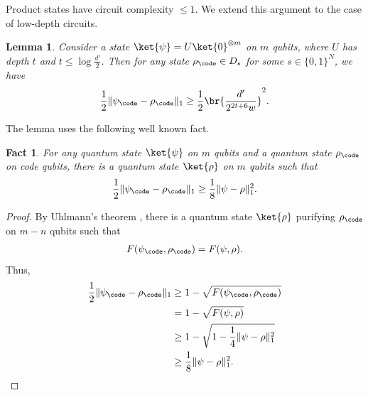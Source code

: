 \documentclass[11pt]{article}
\newtheorem{lemma}[theorem]{Lemma}
\newtheorem{fact}[theorem]{Fact}
\begin{document}
Product states have circuit complexity $\leq 1$. We extend this argument to the case of low-depth circuits.
%
\begin{lemma}
\label{lem:lowdepthunc}
Consider a state $\ket{\psi}= U\ket{0}^{\otimes m}$ on $m$ qubits, where $U$ has depth $t$ and $t\leq \log\frac{d'}{2}$. Then for any state $\rho_{\code}\in D_{s}$ for some $s\in \{0,1\}^N$, we have \begin{align}\frac{1}{2}\|\psi_{\code}-\rho_{\code}\|_1\geq \frac{1}{2}\br{\frac{d'}{2^{2t+6}w}}^2.
\end{align}
\end{lemma}
The lemma uses the following well known fact.
\begin{fact}
\label{fact:uhlmann}
For any quantum state $\ket{\psi}$ on $m$ qubits and a quantum state $\rho_{\code}$ on code qubits, there is a quantum state $\ket{\rho}$ on $m$ qubits such that
\begin{align}\frac{1}{2}\|\psi_{\code}-\rho_{\code}\|_1\geq \frac{1}{8}\|\psi-\rho\|^2_1.\end{align}
\end{fact}
\begin{proof}
By Uhlmann's theorem \cite{uhlmann76}, there is a quantum state $\ket{\rho}$ purifying $\rho_{\code}$ on $m-n$ qubits such that
\begin{align}F(\psi_{\code}, \rho_{\code})=F(\psi,\rho).\end{align}
Thus,
\begin{align}
\frac{1}{2}\|\psi_{\code}-\rho_{\code}\|_1 &\geq 1-\sqrt{F(\psi_{\code},\rho_{\code})} \\
&=1-\sqrt{F(\psi,\rho)} \\
&\geq 1-\sqrt{1-\frac{1}{4}\|\psi-\rho\|^2_1} \\
&\geq \frac{1}{8}\|\psi-\rho\|^2_1.
\end{align}
\end{proof}
\end{document}

